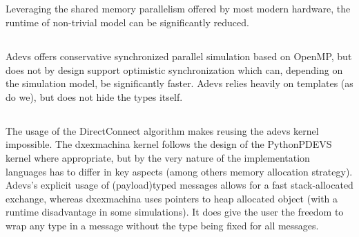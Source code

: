 \subsection{}
Leveraging the shared memory parallelism offered by most modern hardware, the runtime of non-trivial model can be significantly reduced.
\subsection{}
Adevs offers conservative synchronized parallel simulation based on OpenMP, but does not by design support optimistic synchronization which can, depending on the simulation model, be significantly faster. Adevs relies heavily on templates (as do we), but does not hide the types itself. %
\subsection*{}
The usage of the DirectConnect algorithm makes reusing the adevs kernel impossible. The dxexmachina kernel follows the design of the PythonPDEVS kernel where appropriate, but by the very nature of the implementation languages has to differ in key aspects (among others memory allocation strategy). 
Adevs's explicit usage of (payload)typed messages allows for a fast stack-allocated exchange, whereas dxexmachina uses pointers to heap allocated object (with a runtime disadvantage in some simulations). It does give the user the freedom to wrap any type in a message without the type being fixed for all messages. 
